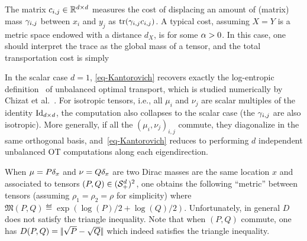 The matrix $c_{i,j} \in \mathbb{R}^{d \times d}$ measures the cost of displacing an amount of (matrix) mass $\gamma_{i,j}$ between $x_i$ and $y_j$  as $\operatorname{tr}(\gamma_{i,j}c_{i,j})$. %
%
A typical cost, assuming $X=Y$ is a metric space endowed with a distance $d_X$, is
for some $\alpha>0$.  In this case, one should interpret the trace as the global mass of a tensor, and the total transportation cost is simply 


\begin{rem}[Classical OT]\label{rem-classical-ot}
	In the scalar case $d=1$, \eqref{eq-Kantorovich} recovers exactly the log-entropic definition~\cite{LieroMielkeSavareLong} of unbalanced optimal transport, which is studied numerically by Chizat et al.~. %
	For isotropic tensors, i.e., all $\mu_i$ and $\nu_j$ are scalar multiples of the identity $\mathrm{Id}_{d \times d}$, the computation also collapses to the scalar case (the $\gamma_{i,j}$ are also isotropic). More generally, if all the $(\mu_i,\nu_j)_{i,j}$ commute, they diagonalize in the same orthogonal basis, and~\eqref{eq-Kantorovich} reduces to performing $d$ independent unbalanced OT computations along each eigendirection. 
\end{rem}

\begin{rem}
	When $\mu=P \delta_{x}$ and $\nu=Q \delta_{x}$ are two Dirac masses are the same location $x$ and associated to tensors $(P,Q) \in (\mathcal{S}_+^d)^2$,
	one obtains the following ``metric'' between tensors (assuming $\rho_1=\rho_2=\rho$ for simplicity)
	where $\mathfrak{M}(P,Q) \eqdef \exp(\log(P)/2+\log(Q)/2)$.
	Unfortunately, in general $D$ does not satisfy the triangle inequality.
	Note that when $(P,Q)$ commute, one has $D(P,Q) = |\!| \sqrt{P}-\sqrt{Q} |\!|$ which indeed satisfies the triangle inequality. 
	
%	
\end{rem}


